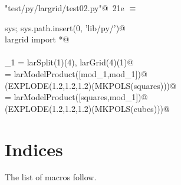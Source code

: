 \documentclass[11pt,oneside]{article}	%
\begin{document}
\begin{flushleft} \small \label{scrap38}
\protect{}\verb@"test/py/largrid/test02.py"@\nobreak\ {\footnotesize 21e }$\equiv$
\vspace{-1ex}
\begin{list}{}{} \item
\mbox{}\verb@import sys; sys.path.insert(0, 'lib/py/')@\\
\mbox{}\verb@from largrid import *@\\
\mbox{}\verb@@\\
\mbox{}\verb@mod_1 = larSplit(1)(4), larGrid(4)(1)@\\
\mbox{}\verb@squares = larModelProduct([mod_1,mod_1])@\\
\mbox{}\verb@VIEW(EXPLODE(1.2,1.2,1.2)(MKPOLS(squares)))@\\
\mbox{}\verb@cubes = larModelProduct([squares,mod_1])@\\
\mbox{}\verb@VIEW(EXPLODE(1.2,1.2,1.2)(MKPOLS(cubes)))@\\
\mbox{}\verb@@{\NWsep}
\end{list}
\vspace{-2ex}
\end{flushleft}


\section{Indices}
\label{sec:indices}

The list of macros follow.
\end{document}
